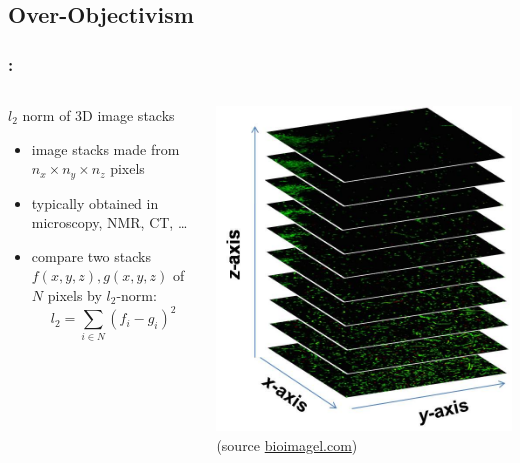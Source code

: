\documentclass[9pt,xcolor=table]{beamer}
\begin{document}
\subsection{Over-Objectivism}
\begin{frame}
\frametitle{\insertsectionhead{}: \insertsubsectionhead{}}
\begin{columns}[c]
    \begin{column}{.45\textwidth}
      \begin{block}{$l_2$ norm of 3D image stacks}
        \begin{itemize}
        \item image stacks made from $n_x \times n_y \times n_z$ pixels
        \item typically obtained in microscopy, NMR, CT, \dots
        \item compare two stacks $f(x,y,z),g(x,y,z)$ of $N$ pixels by $l_2$-norm:\\
          $$ l_2 = \sum_{i \in N} (f_i - g_i)^2 $$
        \end{itemize}
      \end{block}
    \end{column}
    \begin{column}{.45\textwidth}
      \begin{center}
      \includegraphics[width=\textwidth]{img/image_stack}\\[6pt]
      \small(source \href{http://bioimagel.com/3-d_operations}{bioimagel.com})
    \end{center}
    \end{column}
  \end{columns}
\end{frame}
\end{document}
